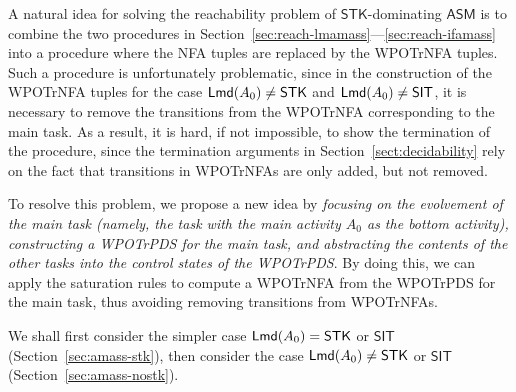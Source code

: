 \documentclass[preprint,12pt]{elsarticle}
\newcommand\lmd{{\sf Lmd}}
\newcommand{\AMASS}{\textsf{ASM}}
\newcommand{\STK}{\mathsf{STK}}
\newcommand{\SIT}{\mathsf{SIT}}
\newcommand{\WOTrPDS}{\textsf{WPOTrPDS}}
\newcommand{\WOTrNFA}{\textsf{WPOTrNFA}}
\newcommand{\NFA}{\textsf{NFA}}
\begin{document}
A natural idea for solving the reachability problem of $\STK$-dominating $\AMASS$ is to combine the two procedures in Section~\ref{sec:reach-lmamass}---\ref{sec:reach-ifamass} into a procedure where the {\NFA} tuples are replaced by the {\WOTrNFA} tuples.  
Such a procedure is unfortunately problematic, since in the construction of the {\WOTrNFA} tuples for the case $\lmd(A_0) \neq \STK$ and $\lmd(A_0) \neq \SIT$, it is necessary to remove the transitions from the {\WOTrNFA} corresponding to the main task. As a result, it is hard, if not impossible, to show the termination of the procedure, since the termination arguments in Section~\ref{sect:decidability} rely on the fact that transitions in {\WOTrNFA}s are only added, but not removed. 

To resolve this problem, we propose a new idea by \emph{focusing on the evolvement of the main task (namely, the task with the main activity $A_0$ as the bottom activity), constructing a {\WOTrPDS} for the main task, and abstracting the contents of the other tasks into the control states of the {\WOTrPDS}}. By doing this, we can apply the saturation rules to compute a {\WOTrNFA} from the {\WOTrPDS} for the main task, thus avoiding removing transitions from {\WOTrNFA}s.

We shall first consider the simpler case $\lmd(A_0) = \STK$ or $\SIT$ (Section~\ref{sec:amass-stk}), then consider the case $\lmd(A_0) \neq \STK$ or $\SIT$ (Section~\ref{sec:amass-nostk}).
\end{document}
